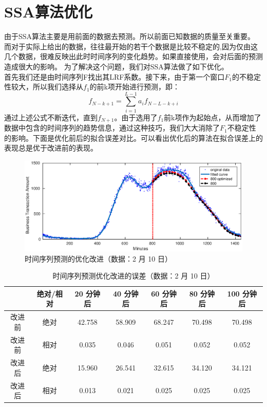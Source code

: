 \documentclass[a4paper]{article}
\begin{document}
\section{SSA算法优化}
\indent 由于SSA算法主要是用前面的数据去预测。所以前面已知数据的质量至关重要。
而对于实际上给出的数据，往往最开始的若干个数据是比较不稳定的,因为仅由这几个数据，很难反映出此时时间序列的变化趋势。如果直接使用，会对后面的预测造成很大的影响。
为了解决这个问题，我们对SSA算法做了如下优化。\\
\indent 首先我们还是由时间序列F找出其LRF系数。接下来，由于第一个窗口$F_1$的不稳定性较大，所以我们选择从$f_1$的前k项开始进行预测，即：
\begin{equation}
f_{N-k+1}=\sum_{i=1}^{L-1}a_if_{N-L-k+i}
\end{equation}
通过上述公式不断迭代，直到$f_{N+1}$。由于选用了$f_1$前k项作为起始点，从而增加了数据中包含的时间序列的趋势信息，通过这种技巧，我们大大消除了$F_1$不稳定性的影响。下面是优化前后的拟合误差对比。可以看出优化后的算法在拟合误差上的表现总是优于改进前的表现。
\begin{figure}[htbp]
	\centering
	\includegraphics[scale=0.6]{pic/opt.eps}
	\caption{时间序列预测的优化改进（数据：2 月 10 日）}
  \label{fig:ssa-opt}
\end{figure}
\begin{table}[htbp]
	\centering
	\caption{时间序列预测优化改进的误差（数据：2 月 10 日）}
	\label{tab:ssa_opt_error}
	\begin{tabular}{cc|ccccc}
		\hline
		 & 绝对/相对 & 20 分钟后 & 40 分钟后 & 60 分钟后 & 80 分钟后  & 100 分钟后 \\
		\hline
		改进前 & 绝对 & 42.758 & 58.909 & 68.247 & 70.498 & 70.498 \\
		改进前 & 相对 & 0.035 & 0.046 & 0.051 & 0.052 & 0.052 \\
		\hline
		改进后 & 绝对 & 15.960 & 26.541 & 32.615 & 34.120 & 34.121 \\
		改进后 & 相对 & 0.013 & 0.021 & 0.025 & 0.025 & 0.025 \\
		\hline
	\end{tabular}
\end{table}
\end{document}

